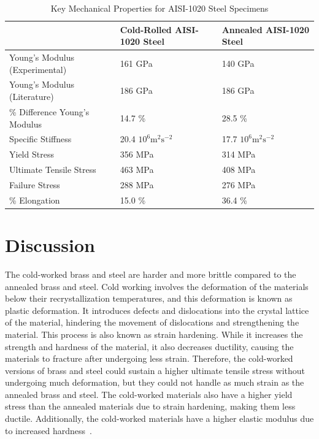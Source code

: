 \documentclass[11pt]{article}
\begin{document}
            \begin{table}[H]
                \caption{Key Mechanical Properties for AISI-1020 Steel Specimens}
                \begin{minipage}{\linewidth}
                    \centering
                    \begin{tabular}{@{}lll@{}}
                        \toprule
                        & Cold-Rolled AISI-1020 Steel & Annealed AISI-1020 Steel \\ 
                        \midrule
                        Young's Modulus (Experimental) & 161 GPa & 140 GPa \\
                        Young's Modulus (Literature) & 186 GPa & 186 GPa \\
                        \% Difference Young's Modulus & 14.7 \% & 28.5 \% \\
                        Specific Stiffness & 20.4 \(10^6\text{m}^2\text{s}^{-2}\) & 17.7 \(10^6\text{m}^2\text{s}^{-2}\) \\
                        Yield Stress & 356 MPa & 314 MPa \\
                        Ultimate Tensile Stress & 463 MPa & 408 MPa \\
                        Failure Stress & 288 MPa & 276 MPa \\
                        \% Elongation & 15.0 \% & 36.4 \% \\ 
                        \bottomrule
                        \end{tabular}\label{tbl_steel}
                \end{minipage}
            \end{table}

    \section{Discussion}
    The cold-worked brass and steel are harder and more brittle compared to the annealed brass and steel. 
    Cold working involves the deformation of the materials below their recrystallization temperatures, and this deformation is known as plastic deformation. 
    It introduces defects and dislocations into the crystal lattice of the material, hindering the movement of dislocations and strengthening the material. 
    This process is also known as strain hardening. 
    While it increases the strength and hardness of the material, it also decreases ductility, causing the materials to fracture after undergoing less strain. 
    Therefore, the cold-worked versions of brass and steel could sustain a higher ultimate tensile stress without undergoing much deformation, but they could not handle as much strain as the annealed brass and steel. 
    The cold-worked materials also have a higher yield stress than the annealed materials due to strain hardening, making them less ductile. 
    Additionally, the cold-worked materials have a higher elastic modulus due to increased hardness~\cite{Lan2013}.
\end{document}
